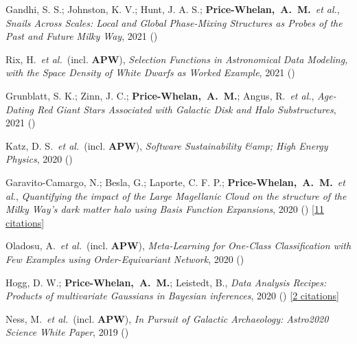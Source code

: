\item[{\color{deemph}\scriptsize13}]Gandhi, S. S.; Johnston, K. V.; Hunt, J. A. S.; \textbf{Price-Whelan,~A.~M.}~\textit{et al.}, \textit{Snails Across Scales: Local and Global Phase-Mixing Structures as Probes of the Past and Future Milky Way}, 2021 ()

\item[{\color{deemph}\scriptsize12}]Rix, H.~\textit{et al.}~(incl. \textbf{APW}), \textit{Selection Functions in Astronomical Data Modeling, with the Space Density of White Dwarfs as Worked Example}, 2021 ()

\item[{\color{deemph}\scriptsize11}]Grunblatt, S. K.; Zinn, J. C.; \textbf{Price-Whelan,~A.~M.}; Angus, R.~\textit{et al.}, \textit{Age-Dating Red Giant Stars Associated with Galactic Disk and Halo Substructures}, 2021 ()

\item[{\color{deemph}\scriptsize10}]Katz, D. S.~\textit{et al.}~(incl. \textbf{APW}), \textit{Software Sustainability {\&}amp; High Energy Physics}, 2020 ()

\item[{\color{deemph}\scriptsize9}]Garavito-Camargo, N.; Besla, G.; Laporte, C. F. P.; \textbf{Price-Whelan,~A.~M.}~\textit{et al.}, \textit{Quantifying the impact of the Large Magellanic Cloud on the structure of the Milky Way's dark matter halo using Basis Function Expansions}, 2020 () [\href{http://adsabs.harvard.edu/abs/2020arXiv201000816G}{11 citations}]

\item[{\color{deemph}\scriptsize8}]Oladosu, A.~\textit{et al.}~(incl. \textbf{APW}), \textit{Meta-Learning for One-Class Classification with Few Examples using Order-Equivariant Network}, 2020 ()

\item[{\color{deemph}\scriptsize7}]Hogg, D. W.; \textbf{Price-Whelan,~A.~M.}; Leistedt, B., \textit{Data Analysis Recipes: Products of multivariate Gaussians in Bayesian inferences}, 2020 () [\href{http://adsabs.harvard.edu/abs/2020arXiv200514199H}{2 citations}]

\item[{\color{deemph}\scriptsize6}]Ness, M.~\textit{et al.}~(incl. \textbf{APW}), \textit{In Pursuit of Galactic Archaeology: Astro2020 Science White Paper}, 2019 ()

